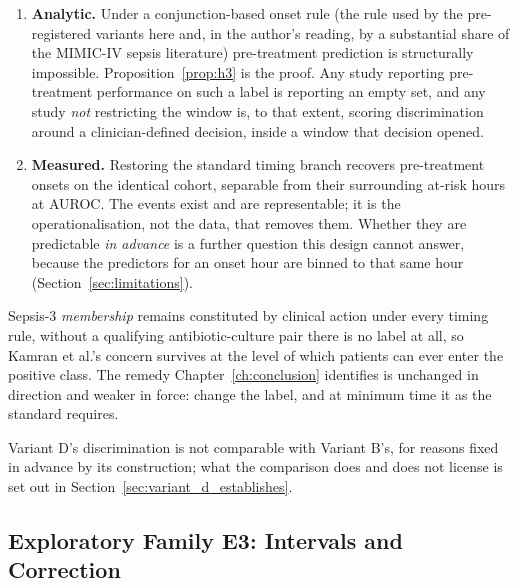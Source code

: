 \begin{enumerate}
    \item \textbf{Analytic.} Under a conjunction-based onset rule (the rule
          used by the pre-registered variants here and, in the author's reading,
          by a substantial share of the MIMIC-IV sepsis literature)
          pre-treatment prediction is structurally impossible.
          Proposition~\ref{prop:h3} is the proof. Any study reporting
          pre-treatment performance on such a label is reporting an empty set,
          and any study \emph{not} restricting the window is, to that extent,
          scoring discrimination around a clinician-defined decision, inside
          a window that decision opened.
    \item \textbf{Measured.} Restoring the standard timing branch recovers
          \pcPreTreatOnsetsVarF{} pre-treatment onsets on the identical cohort,
          separable from their surrounding at-risk hours at
          \pcPreTreatAurocPrimaryF{} AUROC. The events exist and are
          representable; it is the operationalisation, not the data, that
          removes them. Whether they are predictable \emph{in advance} is a
          further question this design cannot answer, because the predictors
          for an onset hour are binned to that same hour
          (Section~\ref{sec:limitations}).
\end{enumerate}

Sepsis-3 \emph{membership} remains constituted by clinical action under every
timing rule, without a qualifying antibiotic-culture pair there is no label
at all, so Kamran et al.'s \cite{kamran2024evaluation} concern survives at the
level of which patients can ever enter the positive class. The remedy
Chapter~\ref{ch:conclusion} identifies is unchanged in direction and weaker in
force: change the label, and at minimum time it as the standard requires.

Variant D's discrimination is not comparable with Variant B's, for reasons
fixed in advance by its construction; what the comparison does and does not
license is set out in Section~\ref{sec:variant_d_establishes}.

\subsection{Exploratory Family E3: Intervals and Correction}

